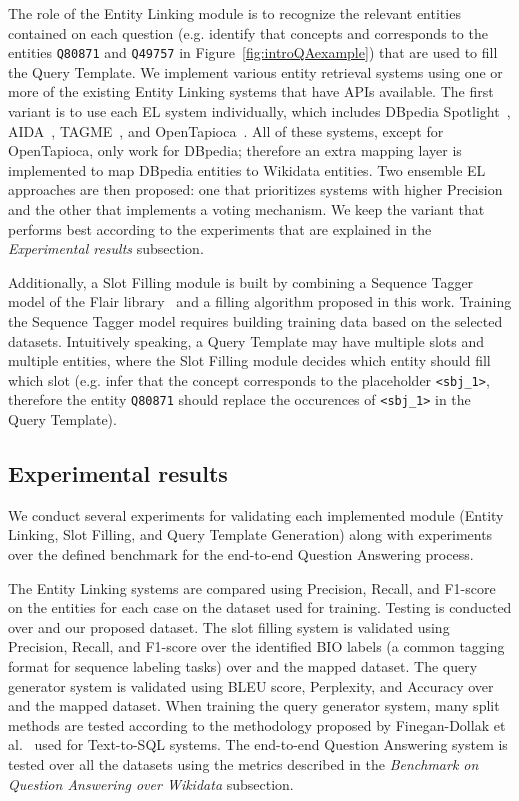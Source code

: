 The role of the Entity Linking module is to recognize the relevant entities contained
on each question (e.g. identify that concepts  and 
corresponds to the entities \texttt{Q80871} and \texttt{Q49757} in Figure~\ref{fig:introQAexample}) 
that are used to fill the Query Template. We implement various entity retrieval systems using 
one or more of the existing Entity 
Linking systems that have APIs available. The first variant is to use each EL system individually, 
which includes DBpedia Spotlight~\cite{EL:dbpedia-spotlight-MendesJGB11}, AIDA~\cite{EL:aida-tool-YosefHBSW11}, 
TAGME~\cite{EL:tagme-FerraginaS10}, and OpenTapioca~\cite{EL:opentapioca-Delpeuch19}. 
All of these systems, except for OpenTapioca, only work for DBpedia; therefore an 
extra mapping layer is implemented to map DBpedia entities to Wikidata entities. Two ensemble 
EL approaches are then proposed: one that prioritizes systems with higher Precision 
and the other that implements a voting mechanism. We keep the variant that performs best 
according to the experiments that are explained in the \textit{Experimental results} subsection.

Additionally, a Slot Filling module is built by combining a Sequence Tagger model of the Flair 
library~\cite{seqlab:flair-AkbikBBRSV19} and a filling algorithm proposed in this work. Training 
the Sequence Tagger model requires building training data based on the selected datasets. 
Intuitively speaking, a Query Template may have multiple slots and multiple entities, where the 
Slot Filling module decides which entity should fill which slot (e.g. infer that the concept 
 corresponds to the placeholder \texttt{<sbj\_1>}, therefore the 
entity \texttt{Q80871} should replace the occurences of \texttt{<sbj\_1>} in the Query Template).

\subsection*{Experimental results}
\label{cap1:intro/contributions/expResults}
We conduct several experiments for validating each implemented module (Entity Linking, 
Slot Filling, and Query Template Generation) along with experiments over the defined 
benchmark for the end-to-end Question Answering process.

The Entity Linking systems are compared using Precision, Recall, and F1-score on the 
entities for each case on the dataset used for training. Testing is conducted over \QALDseven{} and 
our proposed dataset. The slot filling system is validated using Precision, Recall, and F1-score 
over the identified BIO labels (a common tagging format for sequence labeling tasks) over 
\LCQuADtwo{} and the mapped \DBNQA{} dataset. The query generator system is validated 
using BLEU score, Perplexity, and Accuracy over \LCQuADtwo{} and the mapped \DBNQA{} 
dataset. When training the query generator system, many split methods are tested according 
to the methodology proposed by Finegan-Dollak et al.~\cite{semPar:txt-to-sql-RadevKZZFRS18} used for Text-to-SQL systems. 
The end-to-end Question Answering system is tested over all the datasets using the metrics 
described in the \textit{Benchmark on Question Answering over Wikidata} subsection.